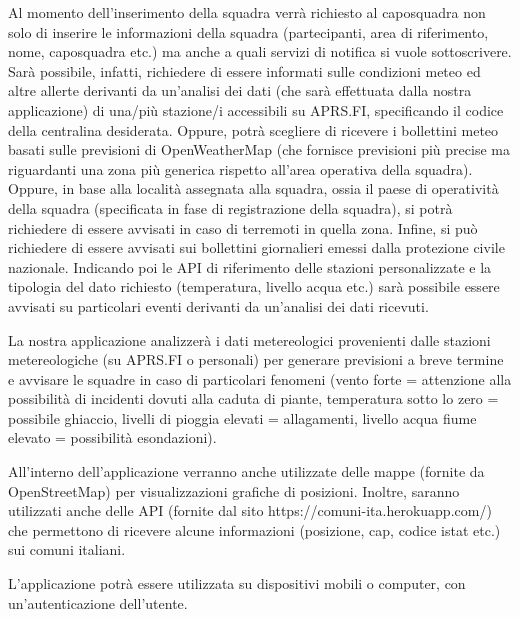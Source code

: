 \documentclass[
		a4paper,
		cleardoublepage=empty,
		headings=twolinechapter,
		numbers=autoenddot,
]{article}
\begin{document}
	Al momento dell’inserimento della squadra verrà richiesto al caposquadra non solo di inserire le informazioni della squadra (partecipanti, area di riferimento, nome, caposquadra etc.) ma anche a quali servizi di notifica si vuole sottoscrivere. Sarà possibile, infatti, richiedere di essere informati sulle condizioni meteo ed altre allerte derivanti da un’analisi dei dati (che sarà effettuata dalla nostra applicazione) di una/più stazione/i accessibili su APRS.FI, specificando il codice della centralina desiderata. Oppure, potrà scegliere di ricevere i bollettini meteo basati sulle previsioni di OpenWeatherMap (che fornisce previsioni più precise ma riguardanti una zona più generica rispetto all’area operativa della squadra). Oppure, in base alla località assegnata alla squadra, ossia il paese di operatività della squadra (specificata in fase di registrazione della squadra), si potrà richiedere di essere avvisati in caso di terremoti in quella zona. Infine, si può richiedere di essere avvisati sui bollettini giornalieri emessi dalla protezione civile nazionale. Indicando poi le API di riferimento delle stazioni personalizzate e la tipologia del dato richiesto (temperatura, livello acqua etc.) sarà possibile essere avvisati su particolari eventi derivanti da un’analisi dei dati ricevuti. 
	
	La nostra applicazione analizzerà i dati metereologici provenienti dalle stazioni metereologiche (su APRS.FI o personali) per generare previsioni a breve termine e avvisare le squadre in caso di particolari fenomeni (vento forte = attenzione alla possibilità di incidenti dovuti alla caduta di piante, temperatura sotto lo zero = possibile ghiaccio, livelli di pioggia elevati = allagamenti, livello acqua fiume elevato = possibilità esondazioni). 
	
	All’interno dell’applicazione verranno anche utilizzate delle mappe (fornite da OpenStreetMap) per visualizzazioni grafiche di posizioni. Inoltre, saranno utilizzati anche delle API (fornite dal sito https://comuni-ita.herokuapp.com/) che permettono di ricevere alcune informazioni (posizione, cap, codice istat etc.) sui comuni italiani.
	
	L’applicazione potrà essere utilizzata su dispositivi mobili o computer, con un’autenticazione dell’utente. 
	
\end{document}
